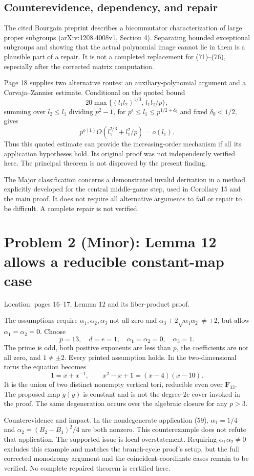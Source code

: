 \documentclass[10pt]{article}
\begin{document}
\subsection*{Counterevidence, dependency, and repair}
The cited Bourgain preprint describes a bicommutator characterization of large proper subgroups (arXiv:1208.4008v1, Section 4). Separating bounded exceptional subgroups and showing that the actual polynomial image cannot lie in them is a plausible part of a repair. It is not a completed replacement for (71)–(76), especially after the corrected matrix computation.\par
Page 18 supplies two alternative routes: an auxiliary-polynomial argument and a Corvaja–Zannier estimate. Conditional on the quoted bound \[20\max\{(l_1l_2)^{1/3},\,l_1l_2/p\},\] summing over \(l_2\le l_1\) dividing \(p^2-1\), for \(p^\epsilon\le l_1\le p^{1/2+\delta_0}\) and fixed \(\delta_0<1/2\), gives \[p^{o(1)}O(l_1^{2/3}+l_1^2/p)=o(l_1).\] Thus this quoted estimate can provide the increasing-order mechanism if all its application hypotheses hold. Its original proof was not independently verified here. The principal theorem is not disproved by the present finding.\par
The Major classification concerns a demonstrated invalid derivation in a method explicitly developed for the central middle-game step, used in Corollary 15 and the main proof. It does not require all alternative arguments to fail or repair to be difficult. A complete repair is not verified.\par
\section*{Problem 2 (Minor): Lemma 12 allows a reducible constant-map case}
Location: pages 16–17, Lemma 12 and its fiber-product proof.\par
The assumptions require \(\alpha_1,\alpha_2,\alpha_3\) not all zero and \(\alpha_3\pm2\sqrt{\alpha_1\alpha_2}\ne\pm2\), but allow \(\alpha_1=\alpha_2=0\). Choose \[p=13,\quad d=e=1,\quad \alpha_1=\alpha_2=0,\quad\alpha_3=1.\] The prime is odd, both positive exponents are less than \(p\), the coefficients are not all zero, and \(1\ne\pm2\). Every printed assumption holds. In the two-dimensional torus the equation becomes \[1=x+x^{-1},\qquad x^2-x+1=(x-4)(x-10).\] It is the union of two distinct nonempty vertical tori, reducible even over \(\mathbf F_{13}\). The proposed map \(g(y)\) is constant and is not the degree-\(2e\) cover invoked in the proof. The same degeneration occurs over the algebraic closure for any \(p>3\).\par
Counterevidence and impact. In the nondegenerate application (59), \(\alpha_1=1/4\) and \(\alpha_2=(B_2-B_1)^2/4\) are both nonzero. This counterexample does not refute that application. The supported issue is local overstatement. Requiring \(\alpha_1\alpha_2\ne0\) excludes this example and matches the branch-cycle proof’s setup, but the full corrected monodromy argument and the coincident-coordinate cases remain to be verified. No complete repaired theorem is certified here.\par
\end{document}
